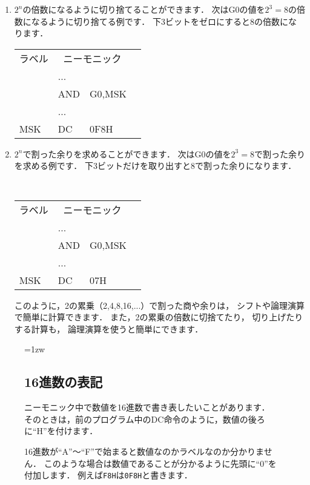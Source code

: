 \begin{enumerate}
\begin{center}
\end{center}

\item $2^n$の倍数になるように切り捨てることができます．
次はG0の値を$2^3=8$の倍数になるように切り捨てる例です．
下3ビットをゼロにすると8の倍数になります．

{\small\tt\begin{center}
\begin{tabular}{|l|l l|l}
\cline{1-3}
ラベル & \multicolumn{2}{|c|}{ニーモニック} & \\
\cline{1-3}
    & ...  &        & \\
    & AND  & G0,MSK & \\
    & ...  &        & \\
MSK & DC   & 0F8H   & \\
\cline{1-3}
\end{tabular}
\end{center}}

\item $2^n$で割った余りを求めることができます．
次はG0の値を$2^3=8$で割った余りを求める例です．
下3ビットだけを取り出すと8で割った余りになります．

\begin{center}
{\small\tt
\begin{tabular}{|l|l l|l}
\cline{1-3}
ラベル & \multicolumn{2}{|c|}{ニーモニック} & \\
\cline{1-3}
    & ...  &        & \\
    & AND  & G0,MSK & \\
    & ...  &        & \\
MSK & DC   & 07H    & \\
\cline{1-3}
\end{tabular}
}
\end{center}

\vspace{1ex}
このように，2の累乗（2,4,8,16,...）で割った商や余りは，
シフトや論理演算で簡単に計算できます．
また，2の累乗の倍数に切捨てたり，
切り上げたりする計算も，
論理演算を使うと簡単にできます．

\end{enumerate}

\begin{figure}[btp]
\begin{framed}{\parindent=1zw
\subsection*{16進数の表記}
ニーモニック中で数値を16進数で書き表したいことがあります．
そのときは，前のプログラム中のDC命令のように，数値の後ろに``H''を付けます．

16進数が``A''〜``F''で始まると数値なのかラベルなのか分かりません．
このような場合は数値であることが分かるように先頭に``0''を付加します．
例えば{\tt F8H}は{\tt 0F8H}と書きます．
}\end{framed}
\end{figure}

